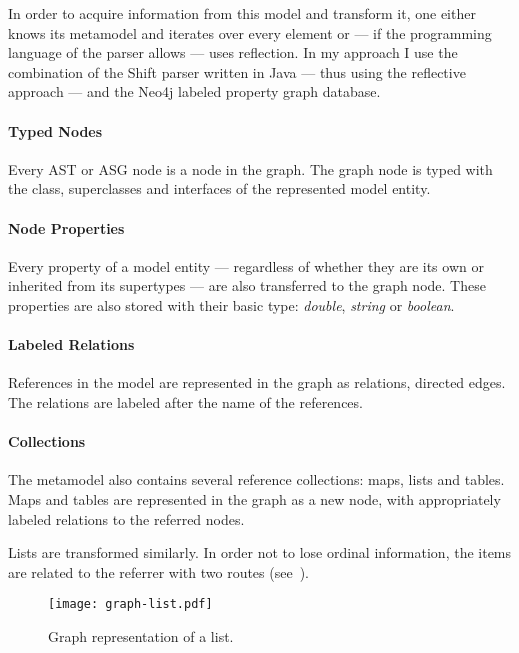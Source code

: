 In order to acquire information from this model and transform it, one either knows its metamodel and iterates over every element or --- if the programming language of the parser allows --- uses reflection. In my approach I use the combination of the Shift parser written in Java --- thus using the reflective approach --- and the Neo4j labeled property graph database.

\paragraph{Typed Nodes}
Every AST or ASG node is a node in the graph. The graph node is typed with the class, superclasses and interfaces of the represented model entity.


\paragraph{Node Properties}
Every property of a model entity --- regardless of whether they are its own or inherited from its supertypes --- are also transferred to the graph node. These properties are also stored with their basic type: \emph{double}, \emph{string} or \emph{boolean}.

\paragraph{Labeled Relations}
References in the model are represented in the graph as relations, directed edges. The relations are labeled after the name of the references.

\paragraph{Collections}
The metamodel also contains several reference collections: maps, lists and tables. Maps and tables are represented in the graph as a new node, with appropriately labeled relations to the referred nodes.

Lists are transformed similarly. In order not to lose ordinal information, the items are related to the referrer with two routes (see~).

\begin{figure}[!htb]
  \centering
  \texttt{[image: graph-list.pdf]}
  \caption{Graph representation of a list.}
  \label{fig:graph-list}
\end{figure}

